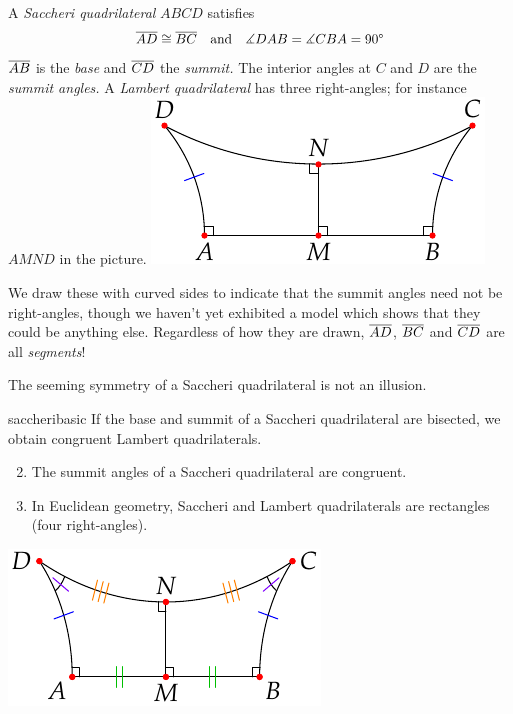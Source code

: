 \begin{defn}[lower separated=false, sidebyside, sidebyside align=top seam, sidebyside gap=0pt, righthand width=0.34\linewidth]{}{}
A \emph{Saccheri quadrilateral} $ABCD$ satisfies
\[\cl{AD}\cong\cl{BC}\quad\text{and}\quad \measuredangle DAB=\measuredangle CBA=\ang{90}\]
$\cl{AB}$ is the \emph{base} and $\cl{CD}$ the \emph{summit.}\smallbreak
The interior angles at $C$ and $D$ are the \emph{summit angles.}\medbreak
A \emph{Lambert quadrilateral} has three right-angles; for instance $AMND$  in the picture.
\tcblower
\flushright\includegraphics{history-quad3}
\end{defn}

We draw these with curved sides to indicate that the summit angles need not be right-angles, though we haven't yet exhibited a model which shows that they could be anything else. Regardless of how they are drawn, $\cl{AD}$, $\cl{BC}$ and $\cl{CD}$ are all \emph{segments}!
\goodbreak

The seeming symmetry of a Saccheri quadrilateral is not an illusion.

\begin{lemm}[lower separated=false, sidebyside, sidebyside align=top seam, sidebyside gap=0pt, righthand width=0.34\linewidth]{}{saccheribasic}
\exstart If the base and summit of a Saccheri quadrilateral are bisected, we obtain congruent Lambert quadrilaterals.
\begin{enumerate}\setcounter{enumi}{1}
  \item The summit angles of a Saccheri quadrilateral are congruent.
	\item In Euclidean geometry, Saccheri and Lambert quadrilaterals are rectangles (four right-angles).
\end{enumerate}
\tcblower
\flushright\includegraphics{history-quad4}
\end{lemm}

